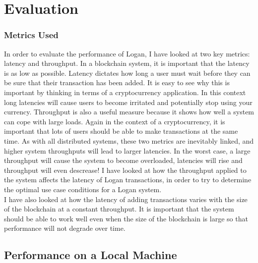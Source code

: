 \documentclass[12pt,a4paper,twoside,openright]{report}
\begin{document}
	\chapter{Evaluation}

	\subsection*{Metrics Used}
	In order to evaluate the performance of Logan, I have looked at two key metrics: latency and throughput.
	In a blockchain system, it is important that the latency is as low as possible. 
	Latency dictates how long a user must wait before they can be sure that their transaction has been added.
	It is easy to see why this is important by thinking in terms of a cryptocurrency application.
	In this context long latencies will cause users to become irritated and potentially stop using your currency.
	Throughput is also a useful measure because it shows how well a system can cope with large loads.
	Again in the context of a cryptocurrency, it is important that lots of users should be able to make transactions at the same time.
	As with all distributed systems, these two metrics are inevitably linked, and higher system throughputs will lead to larger latencies. 
	In the worst case, a large throughput will cause the system to become overloaded, latencies will rise and throughput will even descrease!
	I have looked at how the throughput applied to the system affects the latency of Logan transactions, in order to try to determine the optimal use case conditions for a Logan system.\\

	I have also looked at how the latency of adding transactions varies with the size of the blockchain at a constant throughput.
	It is important that the system should be able to work well even when the size of the blockchain is large so that performance will not degrade over time.
	
	\section{Performance on a Local Machine}
\end{document}
